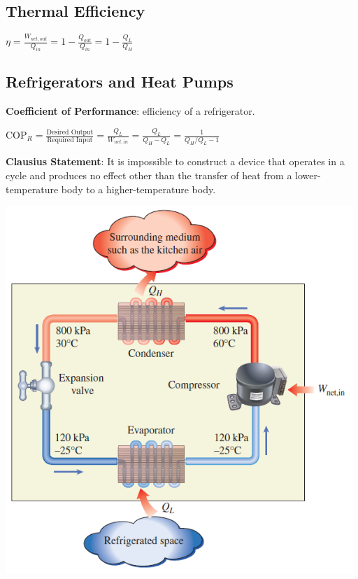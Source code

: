 \documentclass{article}
\begin{document}
\begin{multicols*}{3}
    \subsection*{Thermal Efficiency}
    $\eta = \frac{W_{net,out}}{Q_{in}}=1-\frac{Q_{out}}{Q_{in}}=1-\frac{Q_L}{Q_H}$
    \subsection*{Refrigerators and Heat Pumps}
    \textbf{Coefficient of Performance}: efficiency of a refrigerator.\par 
    $\text{COP}_R=\frac{\text{Desired Output}}{\text{Required Input}}=\frac{Q_L}{W_{net,in}}=\frac{Q_L}{Q_H-Q_L}=\frac{1}{Q_H/Q_L-1}$ \par 
    \textbf{Clausius Statement}: It is impossible to construct a device that operates in a cycle and produces no effect other than the transfer of heat from a lower-temperature body to a higher-temperature body.\par
    \includegraphics[width=0.75\linewidth]{Images/refrigerator.png}

\end{multicols*}
\end{document}
